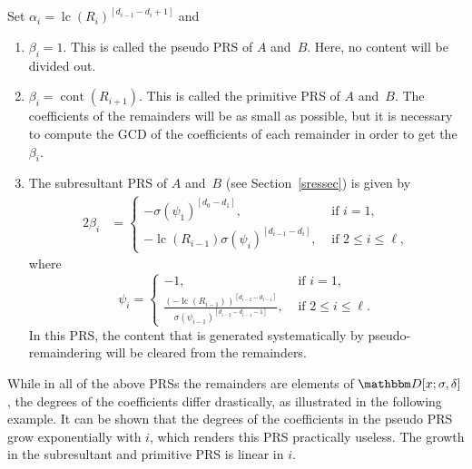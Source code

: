 \documentclass[3p,11pt,preprint]{elsarticle}
\let\set\mathbbm
\def\k{\set D}
\newcommand{\D}{x}
\newcommand{\alg}{\k[\D;\sigma,\delta]}
\newcommand{\lc}{\operatorname{lc}}
\newcommand{\cont}{\operatorname{cont}}
\begin{document}
\begin{example}
\label{prsex}
 Set $\alpha_i =\lc(R_i)^{[d_{i-1}-d_i+1]}$ and
\begin{enumerate}
 \item $\beta_i = 1$. This is called the pseudo PRS of $A$ and~$B$. Here, no content will be divided out.
 \item $\beta_i = \cont(R_{i+1})$. This is called the primitive PRS of $A$ and~$B$. The coefficients of the remainders will be as small as possible, but it is necessary to compute the GCD of the coefficients of each remainder in order to get the $\beta_i$.
 \item \label{sresprs}The subresultant PRS of $A$ and~$B$ (see Section~\ref{sressec}) is given by
\begin{alignat*}2
 \beta_i & = \left\{\begin{array}{ll}
\displaystyle -\sigma(\psi_1)^{[d_0 - d_1]}, & \text{ if } i=1,\\
\displaystyle -\lc(R_{i-1})\sigma(\psi_i)^{[d_{i-1}-d_i]}, & \text{ if } 2\leq i\leq\ell,\end{array}\right.
\end{alignat*}
where
\[
\psi_i = \left\{\begin{array}{ll}
                 \displaystyle -1, & \text{ if } i = 1,\\
                 \displaystyle \frac{(-\lc(R_{i-1}))^{[d_{i-2}-d_{i-1}]}}{\sigma(\psi_{i-1})^{[d_{i-2}-d_{i-1}-1]}}, & \text{ if } 2\leq i\leq\ell.
                \end{array}\right.
\]
In this PRS, the content that is generated systematically by pseudo-remaindering will be cleared from the remainders.
\end{enumerate}
\end{example}

While in all of the above PRSs the remainders are elements of $\alg$, the degrees of the coefficients differ drastically, as illustrated in the following example. It can be shown that the degrees of the coefficients in the pseudo PRS grow exponentially with $i$, which renders this PRS practically useless. The growth in the subresultant and primitive PRS is linear in $i$.
\end{document}
